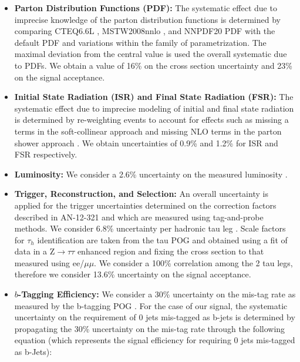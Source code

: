 \begin{itemize}
	\item \textbf{Parton Distribution Functions (PDF):} The systematic effect due to imprecise knowledge of the parton distribution functions is determined by comparing CTEQ6.6L \cite{Nadolsky:2008zw}, MSTW2008nnlo \cite{Martin:2009iq}, and NNPDF20 PDF \cite{Ubiali:2008uk} with the default PDF and variations within the family of parametrization. The maximal deviation from the central value is used the overall systematic due to PDFs. We obtain a value of 16\% on the cross section uncertainty and 23\% on the signal acceptance.
	
	\item \textbf{Initial State Radiation (ISR) and Final State Radiation (FSR):} The systematic effect due to imprecise modeling of initial and final state radiation is determined by re-weighting events to account for effects such as missing a terms in the soft-collinear approach \cite{Nanava:2003cg} and missing NLO terms in the parton shower approach \cite{Miu:1998ju}. We obtain uncertainties of 0.9\% and 1.2\% for ISR and FSR respectively.
	
	\item \textbf{Luminosity:} We consider a 2.6\% uncertainty on the measured luminosity \cite{CMS:2012rua}.
	
	\item \textbf{Trigger, Reconstruction, and Selection:}  An overall uncertainty is applied for the trigger uncertainties determined on the correction factors described in AN-12-321 and which are measured using tag-and-probe methods. We consider 6.8\% uncertainty per hadronic tau leg \cite{CMS:2011msa}. Scale factors for $\tau_{h}$ identification are taken from the tau POG and obtained using a fit of data in a Z$\to\tau\tau$ enhanced region and fixing the cross section to that measured using ee/$\mu\mu$. We consider a 100\% correlation among the 2 tau legs, therefore we consider 13.6\% uncertainty on the signal acceptance.
	
	\item \textbf{$b$-Tagging Efficiency:} We consider a 30\% uncertainty on the mis-tag rate as measured by the b-tagging POG \cite{CMS:2011cra}. For the case of our signal, the systematic uncertainty on the requirement of 0 jets mis-tagged as b-jets is determined by propagating the 30\% uncertainty on the mis-tag rate through the following equation (which represents the signal efficiency for requiring 0 jets mis-tagged as b-Jets):
	

\end{itemize}
